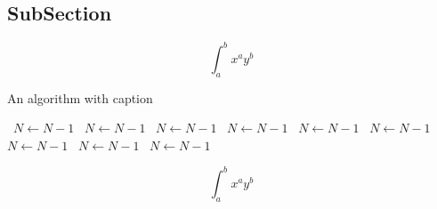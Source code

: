 \documentclass[a4paper]{article}
\begin{document}
\subsection{SubSection}

\[ \int_{a}^{b}{x^{a}y^{b}} \]

\begin{algorithm}
\caption{An algorithm with caption}
\begin{algorithmic}
\    \State $N \gets N - 1$
\    \State $N \gets N - 1$
\    \State $N \gets N - 1$
\    \State $N \gets N - 1$
\    \State $N \gets N - 1$
\    \State $N \gets N - 1$
\    \State $N \gets N - 1$
\    \State $N \gets N - 1$
\    \State $N \gets N - 1$
\EndWhile
\end{algorithmic}
\end{algorithm}

\[ \int_{a}^{b}{x^{a}y^{b}} \]
\end{document}
